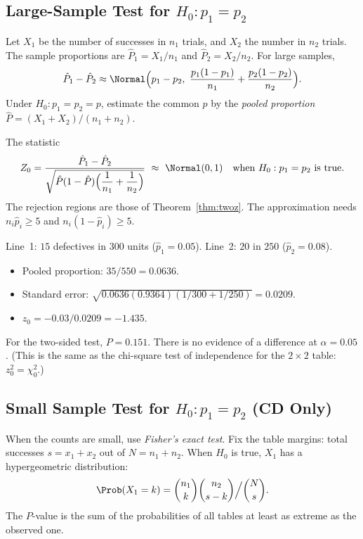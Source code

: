 \subsection{Large-Sample Test for $H_0:p_1=p_2$}

Let $X_1$ be the number of successes in $n_1$ trials, and $X_2$ the number in $n_2$ trials. The sample proportions are $\hat{P}_1=X_1/n_1$ and $\hat{P}_2=X_2/n_2$. For large samples,
\[ \hat{P}_1-\hat{P}_2\approx\Normal\Big(p_1-p_2,\ \frac{p_1(1-p_1)}{n_1}+\frac{p_2(1-p_2)}{n_2}\Big). \]
Under $H_0:p_1=p_2=p$, estimate the common $p$ by the \emph{pooled proportion} $\hat{P}=(X_1+X_2)/(n_1+n_2)$.

\begin{theorem}\label{thm:twoprop}
The statistic
\[ Z_0=\frac{\hat{P}_1-\hat{P}_2}{\sqrt{\hat{P}(1-\hat{P})\Big(\dfrac1{n_1}+\dfrac1{n_2}\Big)}}\ \approx\ \Normal(0,1)\quad\text{when }H_0:p_1=p_2\text{ is true.} \]
The rejection regions are those of Theorem~\ref{thm:twoz}. The approximation needs $n_i\hat{p}_i\ge5$ and $n_i(1-\hat{p}_i)\ge5$.
\end{theorem}

\begin{example}\label{ex:twoprop}
Line~1: $15$ defectives in $300$ units ($\hat{p}_1=0.05$). Line~2: $20$ in $250$ ($\hat{p}_2=0.08$).
\begin{itemize}
  \item Pooled proportion: $35/550=0.0636$.
  \item Standard error: $\sqrt{0.0636(0.9364)(1/300+1/250)}=0.0209$.
  \item $z_0=-0.03/0.0209=-1.435$.
\end{itemize}
For the two-sided test, $P=0.151$. There is no evidence of a difference at $\alpha=0.05$. (This is the same as the chi-square test of independence for the $2\times2$ table: $z_0^2=\chi_0^2$.)
\end{example}

\subsection{Small Sample Test for $H_0:p_1=p_2$ (CD Only)}

When the counts are small, use \emph{Fisher's exact test}. Fix the table margins: total successes $s=x_1+x_2$ out of $N=n_1+n_2$. When $H_0$ is true, $X_1$ has a hypergeometric distribution:
\[ \Prob(X_1=k)=\binom{n_1}{k}\binom{n_2}{s-k}\Big/\binom Ns. \]
The $P$-value is the sum of the probabilities of all tables at least as extreme as the observed one.

